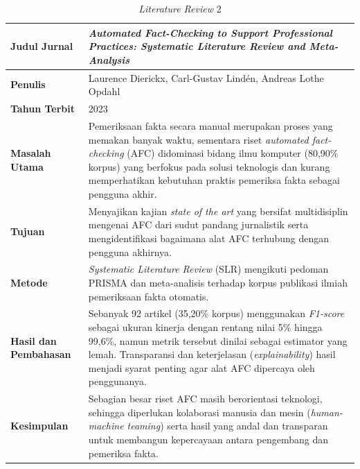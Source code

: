 \documentclass[12pt,a4paper,twoside]{report}
\begin{document}
\clearpage
\begin{table}[H]
  \centering
  \caption{\textit{Literature Review} 2}
  \label{tab:sota2}
  \begin{spacing}{1.15}
  \normalsize
  \begin{tabular}{|L{119.5pt}|L{251.5pt}|}
    \hline
    \textbf{Judul Jurnal} & \textit{Automated Fact-Checking to Support Professional Practices: Systematic Literature Review and Meta-Analysis} \\ \hline
    \textbf{Penulis} & Laurence Dierickx, Carl-Gustav Lind\'{e}n, Andreas Lothe Opdahl \\ \hline
    \textbf{Tahun Terbit} & 2023 \\ \hline
    \textbf{Masalah Utama} & Pemeriksaan fakta secara manual merupakan proses yang memakan banyak waktu, sementara riset \textit{automated fact-checking} (AFC) didominasi bidang ilmu komputer (80,90\% korpus) yang berfokus pada solusi teknologis dan kurang memperhatikan kebutuhan praktis pemeriksa fakta sebagai pengguna akhir. \\ \hline
    \textbf{Tujuan} & Menyajikan kajian \textit{state of the art} yang bersifat multidisiplin mengenai AFC dari sudut pandang jurnalistik serta mengidentifikasi bagaimana alat AFC terhubung dengan pengguna akhirnya. \\ \hline
    \textbf{Metode} & \textit{Systematic Literature Review} (SLR) mengikuti pedoman PRISMA dan meta-analisis terhadap korpus publikasi ilmiah pemeriksaan fakta otomatis. \\ \hline
    \textbf{Hasil dan Pembahasan} & Sebanyak 92 artikel (35,20\% korpus) menggunakan \textit{F1-score} sebagai ukuran kinerja dengan rentang nilai 5\% hingga 99,6\%, namun metrik tersebut dinilai sebagai estimator yang lemah. Transparansi dan keterjelasan (\textit{explainability}) hasil menjadi syarat penting agar alat AFC dipercaya oleh penggunanya. \\ \hline
    \textbf{Kesimpulan} & Sebagian besar riset AFC masih berorientasi teknologi, sehingga diperlukan kolaborasi manusia dan mesin (\textit{human-machine teaming}) serta hasil yang andal dan transparan untuk membangun kepercayaan antara pengembang dan pemeriksa fakta. \\ \hline
  \end{tabular}
  \end{spacing}
\end{table}
\end{document}
